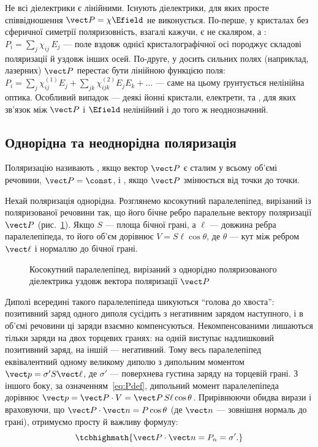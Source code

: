 \begin{Attention}
	Не всі діелектрики є лінійними. Існують діелектрики, для яких просте співвідношення $\vect P = \chi\Efield$ не виконується.
	По-перше, у кристалах без сферичної симетрії поляризовність, взагалі кажучи, є не скаляром, а : $P_i = \sum_j \chi_{ij}\,E_j$
	--- поле вздовж однієї кристалографічної осі породжує складові поляризації й уздовж інших осей. По-друге, у досить сильних полях (наприклад,
	лазерних) $\vect P$ перестає бути лінійною функцією поля: $P_i = \sum_j \chi^{(1)}_{ij}E_j + \sum_{jk}\chi^{(2)}_{ijk}E_jE_k + \ldots$ --- саме
	на цьому ґрунтується нелінійна оптика. Особливий випадок --- деякі йонні кристали,
	електрети, та , для яких зв'язок між $\vect P$ і $\Efield$ нелінійний і до того ж неоднозначний.
\end{Attention}

\subsection*{Однорідна та неоднорідна поляризація}

Поляризацію називають , якщо вектор $\vect P$ є сталим у всьому об'ємі речовини, $\vect P = \const$, і , якщо
$\vect P$ змінюється від точки до точки.

 Нехай поляризація однорідна. Розглянемо косокутний паралелепіпед, вирізаний із поляризованої речовини так, що його
бічне ребро паралельне вектору поляризації $\vect P$ (рис.~\ref{pic:PolarizedParallelepiped}). Якщо $S$ --- площа бічної грані, а $\ell$ --- довжина
ребра паралелепіпеда, то його об'єм дорівнює $V = S\ell\cos\theta$, де $\theta$ --- кут між ребром $\vect \ell$ і нормаллю до бічної грані.

\begin{figure}[h!]\centering
	\caption{Косокутний паралелепіпед, вирізаний з однорідно поляризованого діелектрика уздовж
		вектора поляризації $\vect P$\label{pic:PolarizedParallelepiped}}
\end{figure}

Диполі всередині такого паралелепіпеда шикуються \enquote{голова до хвоста}: позитивний заряд одного диполя сусідить з негативним зарядом наступного, і в
об'ємі речовини ці заряди взаємно компенсуються. Некомпенсованими лишаються тільки заряди на двох торцевих гранях: на одній виступає надлишковий
позитивний заряд, на іншій --- негативний. Тому весь паралелепіпед еквівалентний одному великому диполю з дипольним моментом $\vect p = \sigma' S
	\vect \ell$, де $\sigma'$ --- поверхнева густина  заряду на торцевій грані. З іншого боку, за
означенням~\eqref{eq:Pdef}, дипольний момент паралелепіпеда дорівнює $\vect p = \vect P \cdot V = \vect P \, S\ell\cos\theta$. Прирівнюючи обидва
вирази і враховуючи, що $\vect P \cdot \vect n = P\cos\theta$ (де $\vect n$ --- зовнішня нормаль до грані), отримуємо просту й важливу формулу:
\begin{equation}\label{eq:SigmaPrime}
	\tcbhighmath{
		\vect P \cdot \vect n = P_n = \sigma'.
	}
\end{equation}

